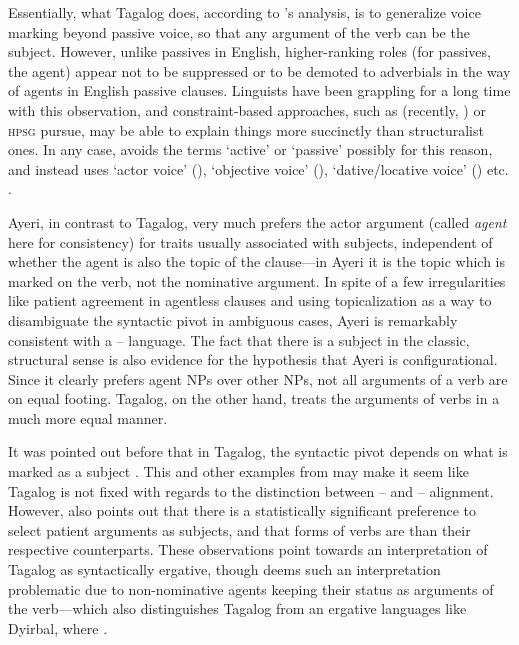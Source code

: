 Essentially, what Tagalog does, according to \citet{kroeger1991}'s analysis, is
to generalize voice marking beyond passive voice, so that any argument of the
verb can be the subject. However, unlike passives in English, higher-ranking
roles (for passives, the agent) appear not to be suppressed or to be demoted to
adverbials in the way of  agents in English passive clauses. Linguists
have been grappling for a long time with this observation, and constraint-based
approaches, such as \Lfg{} (recently, \cite{bresnan2016}) or \textsc{hpsg}
\citep{pollardsag1994} pursue, may be able to explain things more succinctly
than structuralist ones. In any case, \citet{kroeger1991} avoids the terms
`active' or `passive' possibly for this reason, and instead uses `actor voice'
(\Av{}), `objective voice' (\Ov{}), `dative/locative voice' (\Dv{}) etc.
\citep[14--15]{kroeger1991}.

Ayeri, in contrast to Tagalog, very much prefers the actor argument (called
\emph{agent} here for consistency) for traits usually associated with subjects,
independent of whether the agent is also the topic of the clause---in Ayeri it
is the topic which is marked on the verb, not the nominative argument. In spite
of a few irregularities like patient agreement in agentless clauses and using
topicalization as a way to disambiguate the syntactic pivot in ambiguous cases,
Ayeri is remarkably consistent with a \Nom{}--\Acc{} language. The fact that
there is a subject in the classic, structural sense is also evidence for the
hypothesis that Ayeri is configurational. Since it clearly prefers agent NPs
over other NPs, not all arguments of a verb are on equal footing. Tagalog, on
the other hand, treats the arguments of verbs in a much more equal manner.

It was pointed out before that in Tagalog, the syntactic pivot depends on what
is marked as a subject \citep[30--31]{kroeger1991}. This and other examples
from \citet{kroeger1991} may make it seem like Tagalog is not fixed with
regards to the distinction between \Nom{}--\Acc{} and \Erg{}--\Abs{}
alignment. However, \citet{kroeger1991} also points out that there is a
statistically significant preference to select patient arguments as subjects,
and that \Ov{} forms of verbs are  than their respective \Av{} counterparts. These
observations point towards an interpretation of Tagalog as syntactically
ergative, though \citet{kroeger1991} deems such an interpretation problematic
due to non-nominative agents keeping their status as arguments of the
verb---which also distinguishes Tagalog from an ergative languages like
Dyirbal, where .

